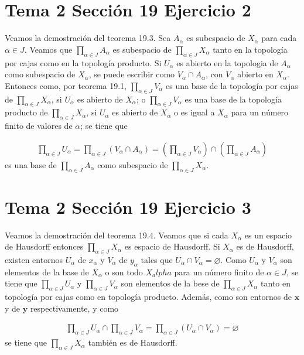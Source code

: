 \documentclass{article}
\newcommand{\vect}[1]{\boldsymbol{#1}}
\begin{document}
\section{Tema 2 Sección 19 Ejercicio 2}
Veamos la demostración del teorema 19.3. Sea $A_\alpha$ es  subespacio de $X_\alpha$ para cada $\alpha\in J$. Veamos que $\prod_{\alpha\in J} A_\alpha$ es subespacio de $\prod_{\alpha\in J} X_\alpha$ tanto en la topología por cajas como en la topología producto. Si $U_\alpha$ es abierto en la topologia de $A_\alpha$ como subespacio de $X_\alpha$, se puede escribir como $V_\alpha \cap A_\alpha$, con $V_\alpha$ abierto en $X_\alpha$. Entonces como, por teorema 19.1, $\prod_{\alpha\in J} V_\alpha$ es una base de la topología por cajas de $\prod_{\alpha\in J} X_\alpha$, si $U_\alpha$ es abierto de $X_\alpha$; o $\prod_{\alpha\in J} V_\alpha$ es una base de la topología producto de $\prod_{\alpha\in J} X_\alpha$, si $U_\alpha$ es abierto de $X_\alpha$ o es igual a $X_\alpha$ para un número finito de valores de $\alpha$; se tiene que 

\begin{eqnarray}
\prod_{\alpha\in J} U_\alpha=\prod_{\alpha\in J} \left(V_\alpha\cap A_\alpha\right)=\left(\prod_{\alpha\in J} V_\alpha\right)\cap \left(\prod_{\alpha\in J}A_\alpha\right)
\end{eqnarray}
es una base de $\prod_{\alpha\in J}A_\alpha$ como subespacio de $\prod_{\alpha\in J}X_\alpha$.

\section{Tema 2 Sección 19 Ejercicio 3}
Veamos la demostración del teorema 19.4. Veamos que si cada $X_\alpha$ es un espacio de Hausdorff entonces $\prod_{\alpha\in J}X_\alpha$ es espacio de Hausdorff. Si $X_\alpha$ es de Hausdorff, existen entornos $U_\alpha$ de $x_\alpha$ y $V_\alpha$ de $y_\alpha$ tales que $U_\alpha \cap V_\alpha=\varnothing$. Como $U_\alpha$ y $V_\alpha$ son elementos de la base de $X_\alpha$ o son todo $X_alpha$ para un número finito de $\alpha\in J$, se tiene que $\prod_{\alpha\in J}U_\alpha$ y $\prod_{\alpha\in J}V_\alpha$ son elementos de la bese de $\prod_{\alpha\in J}X_\alpha$ tanto en topología por cajas como en topología producto. Además, como son entornos de $\vect{x}$ y de $\vect{y}$ respectivamente, y como

\begin{eqnarray}
\prod_{\alpha\in J} U_\alpha\cap \prod_{\alpha\in J} V_\alpha=\prod_{\alpha\in J} \left(U_\alpha\cap V_\alpha\right)=\varnothing\nonumber
\end{eqnarray}
se tiene que  $\prod_{\alpha\in J}X_\alpha$ también es de Hausdorff.
\end{document}
